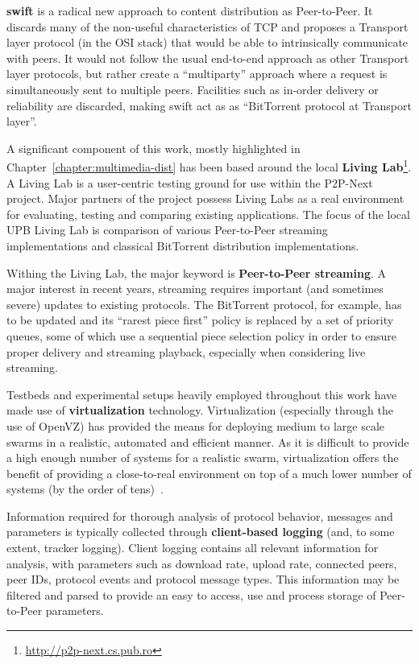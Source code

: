 \textbf{swift} is a radical new approach to content distribution as
Peer-to-Peer. It discards many of the non-useful characteristics of TCP and
proposes a Transport layer protocol (in the OSI stack) that would be able to
intrinsically communicate with peers. It would not follow the usual end-to-end
approach as other Transport layer protocols, but rather create a
``multiparty'' approach where a request is simultaneously sent to multiple
peers. Facilities such as in-order delivery or reliability are discarded,
making swift act as as ``BitTorrent protocol at Transport layer''.

A significant component of this work, mostly highlighted in
Chapter~\ref{chapter:multimedia-dist} has been based around the local
\textbf{Living Lab}\footnote{\url{http://p2p-next.cs.pub.ro}}. A Living Lab is a
user-centric testing ground for use within the P2P-Next project. Major
partners of the project possess Living Labs as a real environment for
evaluating, testing and comparing existing applications. The focus of the
local UPB Living Lab is comparison of various Peer-to-Peer streaming
implementations and classical BitTorrent distribution implementations.

Withing the Living Lab, the major keyword is \textbf{Peer-to-Peer streaming}.
A major interest in recent years, streaming requires important (and sometimes
severe) updates to existing protocols. The BitTorrent protocol, for example,
has to be updated and its ``rarest piece first'' policy is replaced by a set
of priority queues\cite{bitos}, some of which use a sequential piece selection
policy in order to ensure proper delivery and streaming playback, especially
when considering live streaming.

Testbeds and experimental setups heavily employed throughout this work have
made use of \textbf{virtualization} technology. Virtualization (especially
through the use of OpenVZ) has provided the means for deploying medium to
large scale swarms in a realistic, automated and efficient manner. As it is
difficult to provide a high enough number of systems for a realistic swarm,
virtualization offers the benefit of providing a close-to-real environment
on top of a much lower number of systems (by the order of tens)~\cite{p2p-va}.

Information required for thorough analysis of protocol behavior, messages and
parameters is typically collected through \textbf{client-based logging} (and,
to some extent, tracker logging). Client logging contains all relevant
information for analysis, with parameters such as download rate, upload rate,
connected peers, peer IDs, protocol events and protocol message types. This
information may be filtered and parsed to provide an easy to access, use and
process storage of Peer-to-Peer parameters.

